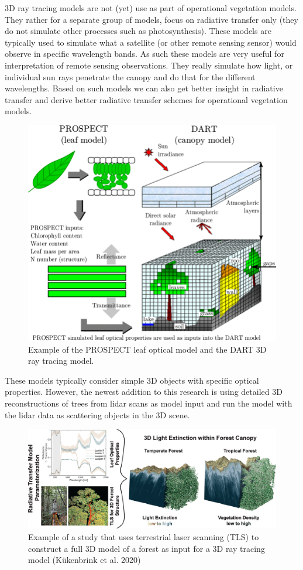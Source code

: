 \documentclass[
  12pt,
  oneside]{book}
\begin{document}
3D ray tracing models are not (yet) use as part of operational vegetation models. They rather for a separate group of models, focus on radiative transfer only (they do not simulate other processes such as photosynthesis). These models are typically used to simulate what a satellite (or other remote sensing sensor) would observe in specific wavelength bands. As such these models are very useful for interpretation of remote sensing observations. They really simulate how light, or individual sun rays penetrate the canopy and do that for the different wavelengths. Based on such models we can also get better insight in radiative transfer and derive better radiative transfer schemes for operational vegetation models.

\begin{figure}

{\centering \includegraphics[width=0.8\linewidth]{figures/chap3/f327_DART} 

}

\caption{Example of the PROSPECT leaf optical model and the DART 3D ray tracing model.}\label{fig:f327}
\end{figure}

These models typically consider simple 3D objects with specific optical properties. However, the newest addition to this research is using detailed 3D reconstructions of trees from lidar scans as model input and run the model with the lidar data as scattering objects in the 3D scene.

\begin{figure}

{\centering \includegraphics[width=0.8\linewidth]{figures/chap3/f328_TLS_RT} 

}

\caption{Example of a study that uses terrestrial laser scanning (TLS) to construct a full 3D model of a forest as input for a 3D ray tracing model (Kükenbrink et al. 2020) }\label{fig:f328}
\end{figure}
\end{document}
